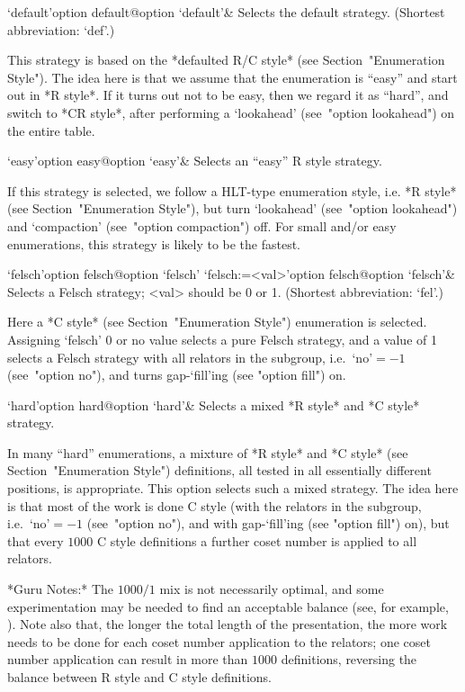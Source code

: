 \beginitems

\>`default'{option default}@{option `default'}&
Selects the default strategy. (Shortest abbreviation: `def'.)

This  strategy  is  based  on   the   *defaulted   R/C   style*   (see
Section~"Enumeration Style"). The idea here is that we assume that the
enumeration is ``easy'' and start out in *R style*. If  it  turns  out
not to be easy, then we regard it  as  ``hard'',  and  switch  to  *CR
style*, after performing a `lookahead' (see~"option lookahead") on the
entire table.

\>`easy'{option easy}@{option `easy'}&
Selects an ``easy'' R style strategy.

If this strategy is selected, we follow a HLT-type enumeration  style,
i.e. *R style* (see Section~"Enumeration Style"), but turn `lookahead'
(see~"option lookahead") and  `compaction'  (see~"option  compaction")
off. For small and/or easy enumerations, this strategy is likely to be
the fastest.

\>`felsch'{option felsch}@{option `felsch'}
\>`felsch:=<val>'{option felsch}@{option `felsch'}&
Selects a Felsch strategy; <val> should be 0 or 1. 
(Shortest abbreviation: `fel'.)

Here a *C style*  (see  Section~"Enumeration  Style")  enumeration  is
selected. Assigning `felsch' 0 or  no  value  selects  a  pure  Felsch
strategy, and a value of 1 selects a Felsch strategy with all relators
in  the  subgroup,  i.e.~`no'${}=-1$  (see~"option  no"),  and   turns
gap-`fill'ing (see "option fill") on.

\>`hard'{option hard}@{option `hard'}&  
Selects a mixed *R style* and *C style* strategy.

In many ``hard'' enumerations, a mixture of *R style*  and  *C  style*
(see Section~"Enumeration  Style")  definitions,  all  tested  in  all
essentially different positions, is appropriate. This  option  selects
such a mixed strategy. The idea here is that most of the work is  done
C  style  (with  the  relators  in  the   subgroup,   i.e.~`no'${}=-1$
(see~"option no"), and with gap-`fill'ing (see "option fill") on), but
that every $1000$ C  style  definitions  a  further  coset  number  is
applied to all relators.

*Guru  Notes:*
The $1000/1$ mix is not necessarily optimal, and some  experimentation
may be needed  to  find  an  acceptable  balance  (see,  for  example,
\cite{HR01}). Note also that, the  longer  the  total  length  of  the
presentation, the more work needs to be done  for  each  coset  number
application to the relators; one coset number application  can  result
in more than $1000$ definitions, reversing the balance between R style
and C style definitions.


